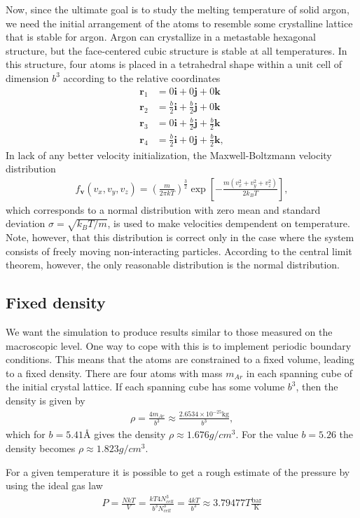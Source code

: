 \documentclass[twoside,utf8]{article}
\newcommand{\EQU}[1] { \begin{equation*} \begin{split} #1 \end{split} \end{equation*} }
\begin{document}
\begin{multicols}{2}
Now, since the ultimate goal is to study the melting temperature of solid argon, we need the initial arrangement of the atoms to resemble some crystalline lattice that is stable for argon. Argon can crystallize in a metastable hexagonal structure, but the face-centered cubic structure is stable at all temperatures\cite{FCCargonStable}.
In this structure, four atoms is placed in a tetrahedral shape within a unit cell of dimension $b^3$ according to the relative coordinates
\EQU{
\mathbf{r}_1 &= 0\mathbf{i} + 0\mathbf{j} + 0\mathbf{k} \\
\mathbf{r}_2 &= \frac{b}{2}\mathbf{i} + \frac{b}{2}\mathbf{j} + 0\mathbf{k} \\
\mathbf{r}_3 &= 0\mathbf{i} + \frac{b}{2}\mathbf{j} + \frac{b}{2}\mathbf{k} \\
\mathbf{r}_4 &= \frac{b}{2}\mathbf{i} + 0\mathbf{j} + \frac{b}{2}\mathbf{k},
}
In lack of any better velocity initialization, the Maxwell-Boltzmann velocity distribution
\EQU{
f_\mathbf{v}(v_x,v_y,v_z)=\left(\frac{m}{2\pi k T}\right)^\frac{3}{2} \exp \left[ -\frac{m(v_x^2+v_y^2+v_z^2)}{2k_BT} \right],
}
which corresponds to a normal distribution with zero mean and standard deviation $\sigma=\sqrt{ k_B T/m }$,
is used to make velocities dempendent on temperature. Note, however, that this distribution is correct only in the case where the system consists of freely moving non-interacting particles. According to the central limit theorem, however, the only reasonable distribution is the normal distribution.


\subsection{Fixed density}
We want the simulation to produce results similar to those measured on the macroscopic level. One way to cope with this is to implement periodic boundary conditions. This means that the atoms are constrained to a fixed volume, leading to a fixed density. There are four atoms with mass $m_{Ar}$ in each spanning cube of the initial crystal lattice. If each spanning cube has some volume $b^3$, then the density is given by
\EQU{
\rho = \frac{ 4 m_{Ar} }{ b^3 } \approx \frac{2.6534 \times 10^{-25} \text{kg} }{b^3},
}
which for $b=5.41$\r{A} gives the density $\rho \approx 1.676 g/cm^3$. For the value $b=5.26$ the density becomes $\rho \approx 1.823 g/cm^3$.

For a given temperature it is possible to get a rough estimate of the pressure by using the ideal gas law 
\EQU{
P = \frac{NkT}{V} = \frac{kT4N_{cell}^3}{b^3 N_{cell}^3} =  \frac{4kT}{b^3} \approx 3.79477T \frac{\text{bar}}{\text{K}}
}


\end{multicols}
\end{document}
